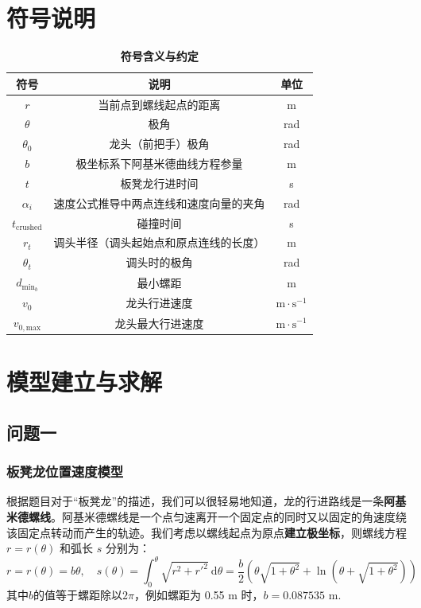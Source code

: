 \documentclass[zihao=-4, UTF8]{article}		%
\theoremstyle{MyLineTheoremStyle} %
\theoremstyle{MyBlockTheoremStyle} %
\theoremstyle{MySubsubsectionStyle} %
\begin{document}
\section{符号说明}
\begin{table}[H]
    \centering
    \caption{\textbf{符号含义与约定}}
    \label{tab:waterpump}
    \begin{tabular}{ccc}
        \toprule
        符号 & 说明& 单位\\
        \midrule
        $r$& 当前点到螺线起点的距离 & m\\
        $\theta$& 极角 & rad\\
        $\theta_0$& 龙头（前把手）极角 & rad\\
        $b$ & 极坐标系下阿基米德曲线方程参量 & m\\
        $t$ & 板凳龙行进时间 & s \\
        $\alpha_{i}$ & 速度公式推导中两点连线和速度向量的夹角 & rad\\
        $t_{\text{crushed}}$ & 碰撞时间 & s\\
        $r_t$ & 调头半径（调头起始点和原点连线的长度） & m\\
        $\theta_t$ & 调头时的极角& rad\\
        $d_{\text{min}_{b}}$ & 最小螺距 & m\\
        $v_{0}$ & 龙头行进速度 & $\mathrm{m}\cdot \mathrm{s}^{-1}$\\
        $v_{0, \text{max}}$ & 龙头最大行进速度 & $\mathrm{m}\cdot \mathrm{s}^{-1}$\\
        \bottomrule
    \end{tabular}
\end{table}

\section{模型建立与求解}

\subsection{问题一}

\subsubsection{板凳龙位置速度模型}
根据题目对于“板凳龙”的描述，我们可以很轻易地知道，龙的行进路线是一条\textbf{阿基米德螺线}。阿基米德螺线是一个点匀速离开一个固定点的同时又以固定的角速度绕该固定点转动而产生的轨迹。我们考虑以螺线起点为原点\textbf{建立极坐标}，则螺线方程 $r = r(\theta)$ 和弧长 $s$ 分别为：
\begin{equation}
    r=r(\theta) = b\theta, \quad
    s(\theta) 
    = \int_0^{\theta} \sqrt{r^2 + r'^2} \  \mathrm{d}\theta 
    = \frac{b}{2}\left( \theta\sqrt{1+\theta^2} + \ln (\theta + \sqrt{1+\theta^2}) \right)
\end{equation}
其中$b$的值等于螺距除以$2\pi$，例如螺距为 0.55 m 时，$b=0.087535$ m.
\end{document}
